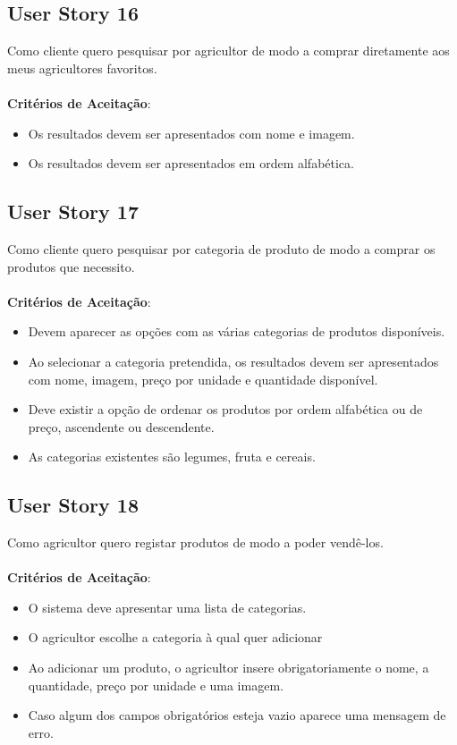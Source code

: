 \documentclass[a4paper,11pt]{article}
\begin{document}
\subsection{User Story 16}
Como cliente quero pesquisar por agricultor de modo a comprar diretamente aos meus agricultores favoritos.\\\\
\textbf{Critérios de Aceitação}:
\begin{itemize}
  \item Os resultados devem ser apresentados com nome e imagem.
  \item Os resultados devem ser apresentados em ordem alfabética.
\end{itemize}
\subsection{User Story 17}
Como cliente quero pesquisar por categoria de produto de modo a comprar os produtos que necessito.\\\\
\textbf{Critérios de Aceitação}:
\begin{itemize}
  \item Devem aparecer as opções com as várias categorias de produtos disponíveis.
  \item Ao selecionar a categoria pretendida, os resultados devem ser apresentados com nome, imagem, preço por unidade e quantidade disponível.
  \item Deve existir a opção de ordenar os produtos por ordem alfabética ou de preço, ascendente ou descendente.
  \item As categorias existentes são legumes, fruta e cereais.
\end{itemize}
\subsection{User Story 18}
Como agricultor quero registar produtos de modo a poder vendê-los.\\\\
\textbf{Critérios de Aceitação}:
\begin{itemize}
  \item O sistema deve apresentar uma lista de categorias.
  \item O agricultor escolhe a categoria à qual quer adicionar 
  \item Ao adicionar um produto, o agricultor insere obrigatoriamente o nome, a quantidade, preço por unidade e uma imagem.
  \item Caso algum dos campos obrigatórios esteja vazio aparece uma mensagem de erro.
\end{itemize}
\end{document}
